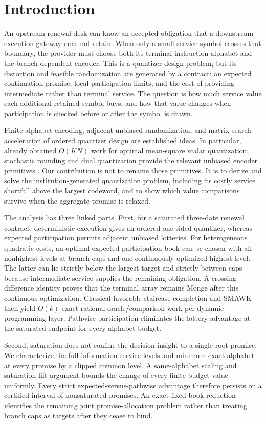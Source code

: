 \section{Introduction}
An upstream renewal desk can know an accepted obligation that a downstream execution gateway does not retain. When only a small service symbol crosses that boundary, the provider must choose both its terminal instruction alphabet and the branch-dependent encoder. This is a quantizer-design problem, but its distortion and feasible randomization are generated by a contract: an expected continuation promise, local participation limits, and the cost of providing intermediate rather than terminal service. The question is how much service value each additional retained symbol buys, and how that value changes when participation is checked before or after the symbol is drawn.

Finite-alphabet encoding, adjacent unbiased randomization, and matrix-search acceleration of ordered quantizer design are established ideas. In particular, \citet{Wu1991} already obtained $O(KN)$ work for optimal mean-square scalar quantization; stochastic rounding and dual quantization provide the relevant unbiased encoder primitives \citep{CrociEtAl2022,PagesWilbertz2012}. Our contribution is not to rename those primitives. It is to derive and solve the institution-generated quantization problem, including its costly service shortfall above the largest codeword, and to show which value comparisons survive when the aggregate promise is relaxed.

The analysis has three linked parts. First, for a saturated three-date renewal contract, deterministic execution gives an ordered one-sided quantizer, whereas expected participation permits adjacent unbiased lotteries. For heterogeneous quadratic costs, an optimal expected-participation book can be chosen with all nonhighest levels at branch caps and one continuously optimized highest level. The latter can lie strictly below the largest target and strictly between caps because intermediate service supplies the remaining obligation. A crossing-difference identity proves that the terminal array remains Monge after this continuous optimization. Classical favorable-staircase completion and SMAWK then yield $O(k)$ exact-rational oracle/comparison work per dynamic-programming layer. Pathwise participation eliminates the lottery advantage at the saturated endpoint for every alphabet budget.

Second, saturation does not confine the decision insight to a single root promise. We characterize the full-information service levels and minimum exact alphabet at every promise by a clipped common level. A same-alphabet scaling and saturation-lift argument bounds the change of every finite-budget value uniformly. Every strict expected-versus-pathwise advantage therefore persists on a certified interval of nonsaturated promises. An exact fixed-book reduction identifies the remaining joint promise-allocation problem rather than treating branch caps as targets after they cease to bind.


